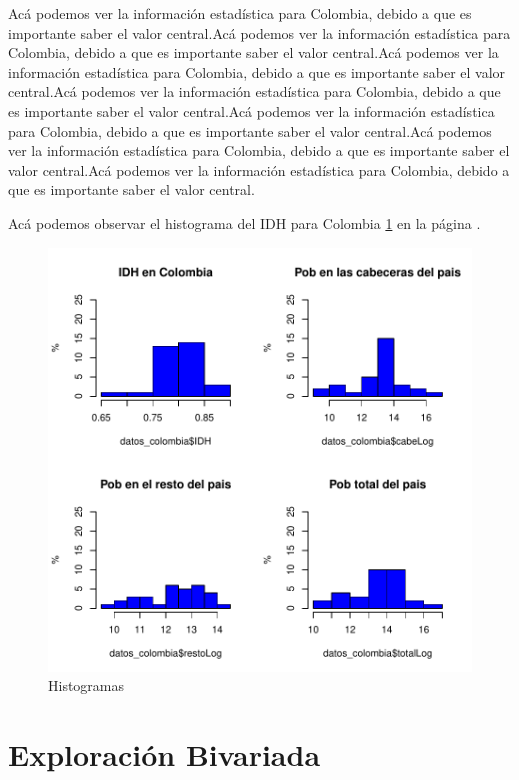 \documentclass{article}
\begin{document}
Ac\'a podemos ver la informaci\'on estad\'istica para Colombia, debido a que es importante saber el valor central.Ac\'a podemos ver la informaci\'on estad\'istica para Colombia, debido a que es importante saber el valor central.Ac\'a podemos ver la informaci\'on estad\'istica para Colombia, debido a que es importante saber el valor central.Ac\'a podemos ver la informaci\'on estad\'istica para Colombia, debido a que es importante saber el valor central.Ac\'a podemos ver la informaci\'on estad\'istica para Colombia, debido a que es importante saber el valor central.Ac\'a podemos ver la informaci\'on estad\'istica para Colombia, debido a que es importante saber el valor central.Ac\'a podemos ver la informaci\'on estad\'istica para Colombia, debido a que es importante saber el valor central.

Ac\'a podemos observar el histograma del IDH para Colombia \ref{histogramas} en la p\'agina \pageref{histogramas}. 

\begin{figure}[h]
\centering
\includegraphics{Proyecto_final-HistogramaIDHPlot}
\caption{Histogramas}
\label{histogramas}
\end{figure}


\section{Exploraci\'on Bivariada}
\end{document}
